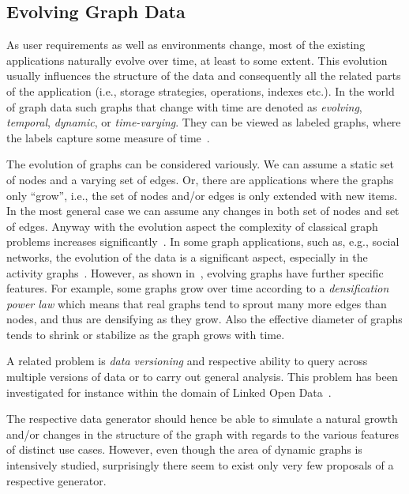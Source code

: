\subsection{Evolving Graph Data}
As user requirements as well as environments change, most of the existing
applications naturally evolve over time, at least to some extent. This evolution
usually influences the structure of the data and consequently all the related
parts of the application (i.e., storage strategies, operations, indexes etc.).
In the world of graph data such graphs that change with time are denoted as \emph{evolving}, \emph{temporal}, \emph{dynamic}, or \emph{time-varying}. They can be viewed as labeled graphs, where the labels capture some measure of time~\cite{Michail2015}.

The evolution of graphs can be considered variously. We can assume a static set of nodes and a varying set of edges.  Or, there are applications where the graphs only ``grow'', i.e., the set of nodes and/or edges is only extended with new items. In the most general case we can assume any changes in both set of nodes and set of edges. Anyway with the evolution aspect the complexity of classical graph problems increases significantly~\cite{Michail2015,Wu:2014:PPT:2732939.2732945}. In some graph applications, such as, e.g., social networks, the evolution of the
data is a significant aspect, especially in the activity graphs~\cite{doreian1997evolution,Kumar:2006:SEO:1150402.1150476,Hellmann2014583,wang2013,Kossinets88,Viswanath:2009:EUI:1592665.1592675}.
However, as shown in~\cite{Leskovec:2005:RMT:2101235.2101254,Leskovec:2005:GOT:1081870.1081893},
evolving graphs have further specific features. For example, some graphs grow over time according to a \emph{densification power law} which means that real graphs tend to sprout many more edges than nodes, and thus are densifying as they grow. Also the effective diameter of graphs tends to shrink or stabilize as the graph grows with time.

A related problem is \emph{data versioning} and respective ability to query across multiple versions of data or to carry out general analysis. 
This problem has been investigated for instance within the domain of Linked
Open Data~\cite{DBLP:conf/semweb/Papakonstantinou16,DBLP:conf/esws/MeimarisP16,fernandez2015towards,fernandez2015bear}.


The respective data generator should hence be able to simulate a natural growth and/or changes in the structure of the graph with regards to the various features of distinct use cases. However,  even though the area of dynamic graphs is intensively studied, surprisingly there seem to exist only very few proposals of a respective generator.

